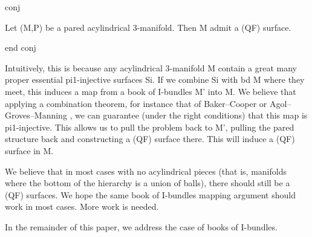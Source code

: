 conj

Let (M,P) be a pared acylindrical 3-manifold. Then M admit a (QF) surface.

end conj

Intuitively, this is because any acylindrical 3-manifold M contain a great many
proper essential pi1-injective surfaces Si. If we combine Si with bd M where
they meet, this induces a map from a book of I-bundles M' into M. We believe
that applying a combination theorem, for instance that of Baker--Cooper
\cite{BCcombination} or Agol--Groves--Manning \cite{AGMcombination}, we can
guarantee (under the right conditions) that this map is pi1-injective. This
allows us to pull the problem back to M', pulling the pared structure back and
constructing a (QF) surface there. This will induce a (QF) surface in M.

We believe that in most cases with no acylindrical pieces (that is, manifolds
where the bottom of the hierarchy is a union of balls), there should still be
a (QF) surfaces. We hope the same book of I-bundles mapping argument should
work in most cases. More work is needed.

In the remainder of this paper, we address the case of books of I-bundles.
